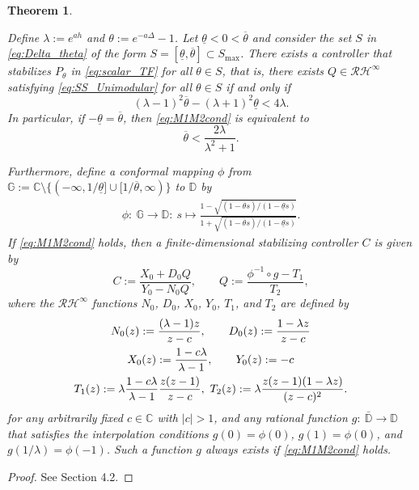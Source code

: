 \documentclass[letterpaper, 12pt, draftcls, onecolumn]{ieeeconf}
\newtheorem{theorem}{Theorem}[section]
\begin{document}
\begin{theorem}
	\label{thm:scalar_LTIcontroller}
	{\it
Define $\lambda := e^{ah}$ and $\theta := e^{-a\Delta} - 1$.
		Let $\underline \theta < 0 < \overline \theta$ and 
		consider the set $S$ in \eqref{eq:Delta_theta} of the form
		$S = [\underline \theta, \overline \theta] \subset S_{\max}$.
		There exists a controller that stabilizes 
		$P_{\theta}$ in \eqref{eq:scalar_TF} 
		for all $\theta \in S$, that is,
		there exists $Q \in \mathcal{RH}^{\infty}$ satisfying
		\eqref{eq:SS_Unimodular} for all $\theta \in S$
		if and only if
		\begin{equation}
		\label{eq:M1M2cond}
		(\lambda-1)^2\overline \theta - (\lambda+1)^2\underline \theta < 4\lambda.
		\end{equation}
		In particular, if $-\underline \theta=\overline \theta$, then \eqref{eq:M1M2cond}
		is equivalent to
		\begin{equation}
		\label{eq:LTI_bound_M}
		\overline \theta < \frac{2\lambda}{\lambda^2+1}.
		\end{equation}
		
		Furthermore, 
		define a conformal mapping $\phi$ from
		$\mathbb{G} := \mathbb{C} \setminus
		\{(-\infty, 1/\underline \theta] \cup [1/\overline \theta,\infty) \}$
		to 
		$\mathbb{D}$ by
		\begin{align}
		\label{eq:conformal_map}
		\phi:~ \mathbb{G} \to \mathbb{D}: ~s \mapsto 
		\frac{ 1 -
			\sqrt{(1-\overline \theta s) / (1-\underline \theta s)}
		}
		{ 1 +
			\sqrt{
				(1-\overline \theta s) / (1-\underline \theta s)}}.
		\end{align}
		If \eqref{eq:M1M2cond} holds, then
		a finite-dimensional stabilizing controller $C$ is given by 
		\begin{equation*}
		C := \frac{X_0+D_0Q}{Y_0-N_0Q},\qquad
		Q := \frac{\phi^{-1} \circ g - T_1}{T_2},
		\end{equation*}
		where the $\mathcal{RH}^{\infty}$ functions 
		$N_0$, $D_0$, $X_0$, $Y_0$, $T_1$, and $T_2$ are defined by
		\begin{gather}
		N_{0}(z) := \frac{(\lambda-1)z}{z-c},\qquad
		D_{0}(z) := \frac{1-\lambda z}{z-c} \notag \\
		X_0(z) := \frac{1 -c \lambda}{\lambda - 1},\qquad
		Y_0(z) := -c \label{eq:XY_def} \\
		T_1 (z):=
		\lambda\frac{1-c \lambda}{\lambda-1}
		\frac{z(z-1)}{z-c},~
		T_2 (z):= 
		\lambda \frac{z(z-1)(1-\lambda z)}
		{(z-c)^2}. \notag 
		\end{gather}
		for any arbitrarily fixed $c \in \mathbb{C}$ with $|c| > 1$, and
		any rational function 
		$g:~\bar{\mathbb{D}} \to \mathbb{D}$ that satisfies
		the interpolation conditions $g(0) = \phi(0)$,
		$g(1) = \phi(0)$, and $g(1/\lambda) = \phi(-1)$.
		Such a function $g$ always exists if \eqref{eq:M1M2cond} holds.
	}
\end{theorem}
\begin{proof}
	See Section 4.2.
\end{proof}
\end{document}
